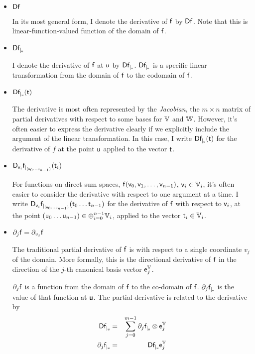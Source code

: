 \begin{itemize}

\item ${\mathsf{D}{\mathsf{f}}}$

In its most general form,
I denote the derivative of $\mathsf{f}$ by ${\mathsf{D}{\mathsf{f}}}$.
Note that this is linear-function-valued function of the domain of $\mathsf{f}$.

\item ${\mathsf{D}{\mathsf{f}}_{\mid_{\mathsf{u}}}}$

I denote the derivative of $\mathsf{f}$ at $\mathsf{u}$ by ${\mathsf{D}{\mathsf{f}}_{\mid_{\mathsf{u}}}}$.
${\mathsf{D}{\mathsf{f}}_{\mid_{\mathsf{u}}}}$ is a specific linear transformation from
the domain of $\mathsf{f}$ to the codomain of $\mathsf{f}$.

\item ${\mathsf{D}{\mathsf{f}}_{\mid_{\mathsf{u}}}({\mathsf{t}})}$

The derivative is most often represented by the \textit{Jacobian},
the $m \times n$ matrix of partial derivatives
with respect to some bases for $\mathbb{V}$ and $\mathbb{W}$.
However, it's often easier to express the derivative clearly if we
explicitly include the argument of the linear transformation.
In this case, I write ${\mathsf{D}{\mathsf{f}}_{\mid_{\mathsf{u}}}({\mathsf{t}})}$
for the derivative of $f$ at the point $\mathsf{u}$
applied to the vector $\mathsf{t}$.

\item ${\mathsf{D}_{\mathsf{v}_i}{{\mathsf{f}}}_{\mid_{(\mathsf{u}_0 \ldots \mathsf{u}_{n-1})}}({{\mathsf{t}_i}})}$

For functions on direct sum spaces,
$\mathsf{f}(\mathsf{v}_0,\mathsf{v}_1, \ldots, \mathsf{v}_{n-1})$, $\mathsf{v}_i \in \mathbb{V}_i$,
it's often easier to consider the derivative
with respect to one argument at a time.
I write ${\mathsf{D}_{\mathsf{v}_i}{{\mathsf{f}}}_{\mid_{(\mathsf{u}_0 \ldots \mathsf{u}_{n-1})}}({{\mathsf{t}_0 \ldots \mathsf{t}_{n-1}}})}$
for the derivative of $\mathsf{f}$ with respect to $\mathsf{v}_i$,
at the point $(\mathsf{u}_0 \ldots \mathsf{u}_{n-1}) \in \oplus_{i=0}^{n-1} \mathbb{V}_i$,
applied to the vector $\mathsf{t}_i \in \mathbb{V}_i$.

\item ${\partial}_{j}{\mathsf{f}} = {\partial}_{v_j}{\mathsf{f}}$

The traditional partial derivative of $\mathsf{f}$ is with respect to
a single coordinate $v_j$ of the domain.
More formally, this is the directional derivative of $\mathsf{f}$
in the direction of the $j$-th canonical basis vector $\mathsf{e}_j^{\mathbb{V}}$.

${\partial}_{j}{\mathsf{f}}$ is a function from the domain of $\mathsf{f}$ to the co-domain of $\mathsf{f}$.
${\partial}_{j}{\mathsf{f}}_{\mid_{\mathsf{u}}}$ is the value of that function at $\mathsf{u}$.
The partial derivative is related to the derivative by
\begin{eqnarray}
\label{eq:partial-full-dervatives}
{\mathsf{D}{\mathsf{f}}_{\mid_{\mathsf{u}}}}
& = &
\sum_{j=0}^{m-1} {\partial}_{j}{\mathsf{f}}_{\mid_{\mathsf{u}}} \otimes \mathsf{e}_j^{\mathbb{V}}
\\
{\partial}_{j}{\mathsf{f}}_{\mid_{\mathsf{u}}}
& = &
{\mathsf{D}{\mathsf{f}}_{\mid_{\mathsf{u}}}} \mathsf{e}_j^{\mathbb{V}}
\nonumber
\end{eqnarray}


\end{itemize}
